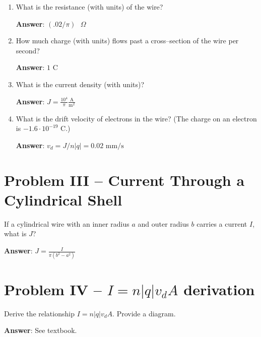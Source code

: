 \documentclass{article}
\newcommand{\ds}[0]{\displaystyle}
\begin{document}
\begin{enumerate}

  \item What is the resistance (with units) of the wire?

        \ifsolutions
        \textbf{Answer}: $(.02/\pi)\text{ }\Omega$
        \else
        \vskip 84pt
        \fi

  \item How much charge (with units) flows past a cross--section of the wire per second?

        \ifsolutions
        \textbf{Answer}: $1\text{ C}$
        \else
        \vskip 84pt
        \fi

  \item What is the current density (with units)?

        \ifsolutions
        \textbf{Answer}: $\ds J = \frac{10^4}{\pi}\frac{\text{A}}{\text{m}^2}$
        \else
        \vskip 84pt
        \fi

  \item What is the drift velocity of electrons in the wire? (The charge on an electron is $-1.6·10^{-19}\text{ C}$.)

        \ifsolutions
        \textbf{Answer}: $v_d = J/n|q| = 0.02\text{ mm/s}$
        \else
        \vskip 84pt
        \fi

\end{enumerate}

\ifsolutions

\else

\newpage
\fi

\section{Problem III -- Current Through a Cylindrical Shell}

If a cylindrical wire with an inner radius $a$ and outer radius $b$ carries a current $I$, what is $J$?

\ifsolutions
\textbf{Answer}: $\ds J=\frac{I}{\pi(b^2-a^2)}$
\else
\vskip 84pt
\fi

\section{Problem IV -- $I = n|q|v_dA$ derivation}

Derive the relationship $I = n|q|v_dA$. Provide a diagram.

\ifsolutions
\textbf{Answer}: See textbook.
\else

\fi
\end{document}
